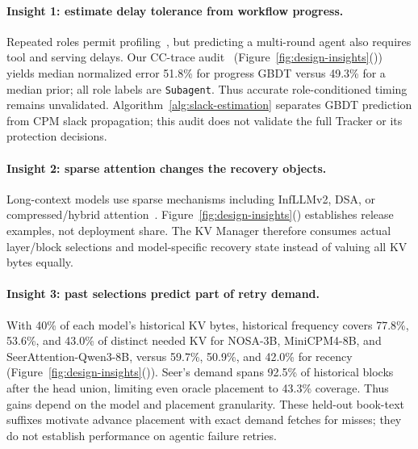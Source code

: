 \paragraph{Insight 1: estimate delay tolerance from workflow progress.}
Repeated roles permit profiling~\cite{yu2026pythia}, but predicting a
multi-round agent also requires tool and serving delays. Our CC-trace
audit~\cite{semianalysis2026cctraces}
(Figure~\ref{fig:design-insights}()) yields median normalized error
51.8\% for progress GBDT versus 49.3\% for a median prior; all role labels
are \texttt{Subagent}. Thus accurate role-conditioned timing remains
unvalidated. Algorithm~\ref{alg:slack-estimation} separates GBDT
prediction from CPM slack propagation; this audit does not validate
the full Tracker or its protection decisions.

\paragraph{Insight 2: sparse attention changes the recovery objects.}
Long-context models use sparse mechanisms including InfLLMv2,
DSA, or compressed/hybrid attention~\cite{minicpm4model,
openbmb2025minicpm41,deepseek2025v32exp,deepseek2025v32model,
zai2026glm5model,openbmb2026sala,deepseek2026v4model,minimax2026m3,
zai2026glm52,longcat2026sparse}.
Figure~\ref{fig:design-insights}()
establishes release examples, not deployment share.
The KV Manager therefore consumes actual layer/block selections and
model-specific recovery state instead of valuing all KV bytes equally.

\paragraph{Insight 3: past selections predict part of retry demand.}
With 40\% of each model's historical KV bytes, historical frequency
covers 77.8\%, 53.6\%, and 43.0\% of distinct needed KV for NOSA-3B,
MiniCPM4-8B, and SeerAttention-Qwen3-8B, versus 59.7\%, 50.9\%, and
42.0\% for recency
(Figure~\ref{fig:design-insights}()).
Seer's demand spans 92.5\% of historical blocks after the head union,
limiting even oracle placement to 43.3\% coverage. Thus gains depend on
the model and placement granularity. These held-out book-text suffixes
motivate advance placement with exact demand fetches for misses;
they do not establish performance on agentic failure retries.
